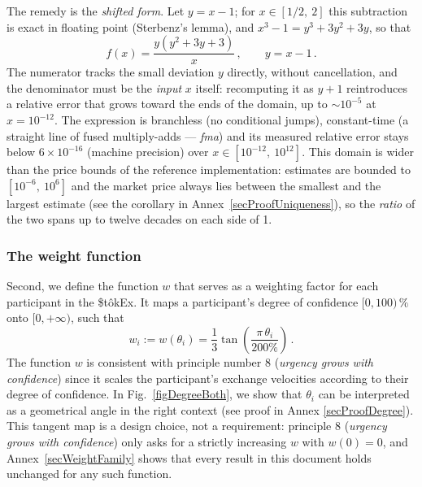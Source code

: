 \documentclass[letterpaper]{article}
\newcommand{\StokEx}{\$t\^{o}kEx}
\begin{document}
The remedy is the \emph{shifted form}. Let $y = x - 1$; for $x \in [1/2,\ 2]$ this subtraction is exact in floating point (Sterbenz's lemma), and $x^3 - 1 = y^3 + 3y^2 + 3y$, so that
\begin{equation}
    f(x) = \frac{y\left(y^2 + 3y + 3\right)}{x}\,, \qquad y = x - 1\,. \label{eqShiftedForm}
\end{equation}
The numerator tracks the small deviation $y$ directly, without cancellation, and the denominator must be the \emph{input} $x$ itself: recomputing it as $y + 1$ reintroduces a relative error that grows toward the ends of the domain, up to $\sim 10^{-5}$ at $x = 10^{-12}$. The expression is branchless (no conditional jumps), constant-time (a straight line of fused multiply-adds --- \emph{fma}) and its measured relative error stays below $6 \times 10^{-16}$ (machine precision) over $x \in [10^{-12},\ 10^{12}]$. This domain is wider than the price bounds of the reference implementation: estimates are bounded to $[10^{-6},\ 10^{6}]$ and the market price always lies between the smallest and the largest estimate (see the corollary in Annex~\ref{secProofUniqueness}), so the \emph{ratio} of the two spans up to twelve decades on each side of 1.


\subsubsection{The weight function}

Second, we define the function $w$ that serves as a weighting factor for each participant in the \StokEx{}. It maps a participant's degree of confidence $[0, 100)\,\%$ onto $[0,+\infty)$, such that
\begin{equation}
    w_i := w\left(\theta_i\right) = \frac{1}{3}\tan \left( \frac{\pi \,\theta_i}{200\%}\right)\,. \label{eqFunctionW}
\end{equation}
The function $w$ is consistent with principle number 8 (\emph{urgency grows with confidence}) since it scales the participant's exchange velocities according to their degree of confidence. In Fig.~\ref{figDegreeBoth}, we show that $\theta_i$ can be interpreted as a geometrical angle in the right context (see proof in Annex \ref{secProofDegree}). This tangent map is a design choice, not a requirement: principle 8 (\emph{urgency grows with confidence}) only asks for a strictly increasing $w$ with $w(0) = 0$, and Annex~\ref{secWeightFamily} shows that every result in this document holds unchanged for any such function.
\end{document}
